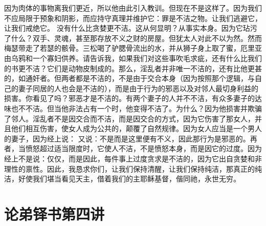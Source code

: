 因为肉体的事物离我们更近，所以他由此引入教训。但现在不是这样了。因为我们不应局限于预象和阴影，而应持守真理并维护它：罪是不洁之物。让我们逃避它，让我们戒绝它。 没有什么比贪婪更不洁。这从何显明？从事实本身。因为它玷污了什么？双手、灵魂，甚至那存放不义之财的房屋。但犹太人对此不以为然。然而梅瑟带走了若瑟的骸骨。三松喝了驴腮骨流出的水，并从狮子身上取了蜜，厄里亚由乌鸦和一个寡妇供养。请告诉我，如果我们对这些事吹毛求疵，还有什么比我们的书更不洁？它们是动物皮制成的。那么，淫乱者并非唯一不洁的，还有比他更甚的，如通奸者。但两者都是不洁的，不是由于交合本身（因为按照那个逻辑，与自己的妻子同居的人也会是不洁的），而是由于行为的邪恶以及对邻人最切身利益的损害。你看见了吗？邪恶才是不洁的。有两个妻子的人并不不洁，有众多妻子的达味也不不洁。但当他非法占有一个时，他变得不洁了。为什么？因为他损害并欺骗了邻人。淫乱者不是因交合而不洁，而是因交合的方式，因为它伤害了那女人，并且他们相互伤害，使女人成为公共的，颠覆了自然规律。因为女人应当是一个男人的妻子，因为经上说： 又说：不是而是这里便有不义，因此那行为是邪恶的。再者，当愤怒超过适当限度时，它使人不洁，不是愤怒本身，而是因它的过度。因为经上不是说：仅仅，而是因此，每件事上过度贪求是不洁的，因为它出自贪婪和非理性的禀性。因此，我恳求你们，让我们保持清醒，让我们保持纯洁，那真正的纯洁，好使我们堪当看见天主，借着我们的主耶稣基督，偕同祂，永世无穷。\par



\section{论弟铎书第四讲}

\par

\par

